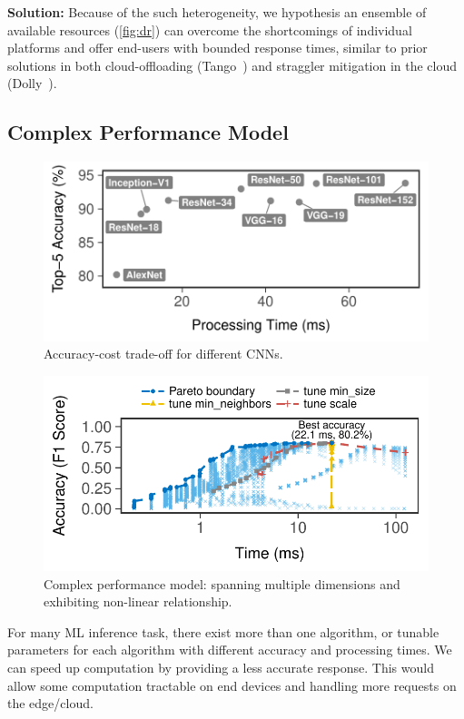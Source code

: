 \textbf{Solution:} Because of the such heterogeneity, we hypothesis an ensemble
of available resources (\autoref{fig:dr}) can overcome the shortcomings of
individual platforms and offer end-users with bounded response times, similar to
prior solutions in both cloud-offloading (Tango~\cite{gordon2015accelerating})
and straggler mitigation in the cloud
(Dolly~\cite{ananthanarayanan2013effective}).

\subsection{Complex Performance Model}
\label{sec:comp-perf-model}

\begin{figure}[t]
  \centering
  \includegraphics[width=.9\columnwidth]{figures/tradeoff-cnn.pdf}
  \caption{Accuracy-cost trade-off for different CNNs.}
  \label{fig:motiv-functions}
\end{figure}

\begin{figure}[t]
  \centering
  \includegraphics[width=.9\columnwidth]{figures/exhaustive-face.pdf}
  \caption{Complex performance model: spanning multiple dimensions and
    exhibiting non-linear relationship.}
  \label{fig:motiv-params}
\end{figure}

For many ML inference task, there exist more than one algorithm, or tunable
parameters for each algorithm with different accuracy and processing times.  We
can speed up computation by providing a less accurate response. This would allow
some computation tractable on end devices and handling more requests on the
edge/cloud.

